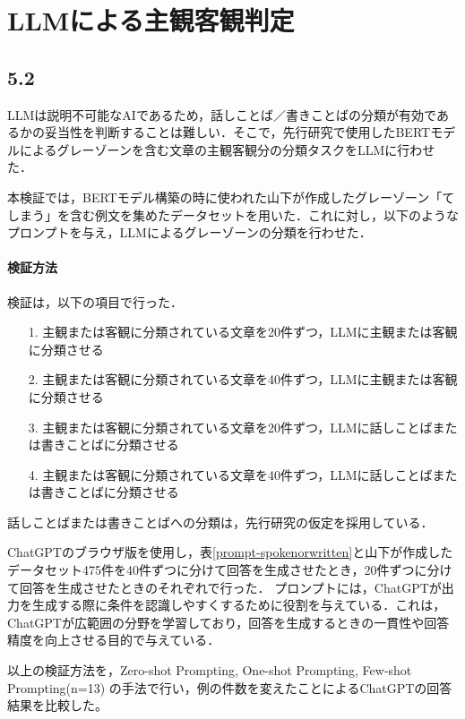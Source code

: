 \chapter{LLMによる主観客観判定 \label{c5}}

\section{5.2 \label{c5s2}}
LLMは説明不可能なAIであるため，話しことば／書きことばの分類が有効であるかの妥当性を判断することは難しい．そこで，先行研究で使用したBERTモデルによるグレーゾーンを含む文章の主観客観分の分類タスクをLLMに行わせた．

本検証では，BERTモデル構築の時に使われた山下が作成したグレーゾーン「てしまう」を含む例文を集めたデータセットを用いた．これに対し，以下のようなプロンプトを与え，LLMによるグレーゾーンの分類を行わせた．



\subsubsection{検証方法}
検証は，以下の項目で行った．
\begin{itemize}
    \item[1.] 主観または客観に分類されている文章を20件ずつ，LLMに主観または客観に分類させる
    \item[2.] 主観または客観に分類されている文章を40件ずつ，LLMに主観または客観に分類させる
    \item[3.] 主観または客観に分類されている文章を20件ずつ，LLMに話しことばまたは書きことばに分類させる
    \item[4.] 主観または客観に分類されている文章を40件ずつ，LLMに話しことばまたは書きことばに分類させる
\end{itemize}
話しことばまたは書きことばへの分類は，先行研究\cite{checker}の仮定を採用している．

ChatGPTのブラウザ版を使用し，表\ref{prompt-spokenorwritten}と山下が作成したデータセット475件を40件ずつに分けて回答を生成させたとき，20件ずつに分けて回答を生成させたときのそれぞれで行った．
プロンプトには，ChatGPTが出力を生成する際に条件を認識しやすくするために役割を与えている．これは，ChatGPTが広範囲の分野を学習しており，回答を生成するときの一貫性や回答精度を向上させる目的で与えている．




以上の検証方法を，Zero-shot Prompting, One-shot Prompting, Few-shot Prompting(n=13) の手法で行い，例の件数を変えたことによるChatGPTの回答結果を比較した。

